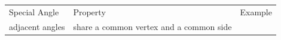 {{    \addtocounter{footnote}{-0}
    
          }{ %
        
    
        \begin{center}
      
      \label{m39370*id315548}
      
    \noindent
      \tablelasttail{}
      \begin{xtabular}[t]{|l|l|l|}\hline
    
    
        Special Angle &
    
    
        Property &
    
    
        Example%
     \tabularnewline{}
    
    
        adjacent angles &
    
    
        share a common vertex and a common side &
    
    

\end{xtabular}
\end{center}}}
